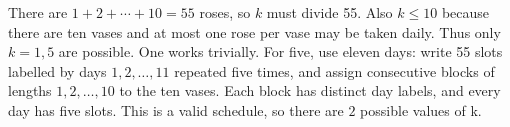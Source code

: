 There are $1+2+\cdots+10=55$ roses, so $k$ must divide 55. Also $k\le10$ because there are ten vases and at most one rose per vase may be taken daily. Thus only $k=1,5$ are possible. One works trivially. For five, use eleven days: write 55 slots labelled by days $1,2,\ldots,11$ repeated five times, and assign consecutive blocks of lengths $1,2,\ldots,10$ to the ten vases. Each block has distinct day labels, and every day has five slots. This is a valid schedule, so there are $\boxed2$ possible values of k.
